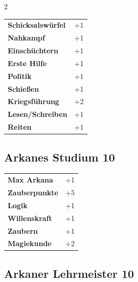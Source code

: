 \begin{multicols}{2}
\begin{tcolorbox}
\begin{tabular}{@{}ll@{}}
    \textbf{Schicksalswürfel} & +1\\
    \textbf{Nahkampf} & +1\\
    \textbf{Einschüchtern} & +1\\
    \textbf{Erste Hilfe} & +1\\
    \textbf{Politik} & +1\\
    \textbf{Schießen} & +1\\
    \textbf{Kriegsführung} & +2\\
    \textbf{Lesen/Schreiben} & +1\\
    \textbf{Reiten} & +1\\
\end{tabular}


\end{tcolorbox}

\begin{tcolorbox}
    \subsection*{Arkanes Studium \hfill \small{10 }}
    \tcblower




\begin{tabular}{@{}ll@{}}
    \textbf{Max Arkana} & +1\\
    \textbf{Zauberpunkte} & +5\\
    \textbf{Logik} & +1\\
    \textbf{Willenskraft} & +1\\
    \textbf{Zaubern} & +1\\
    \textbf{Magiekunde} & +2\\
\end{tabular}


\end{tcolorbox}

\begin{tcolorbox}
    \subsection*{Arkaner Lehrmeister \hfill \small{10 }}
    \tcblower



\end{tcolorbox}
\end{multicols}
